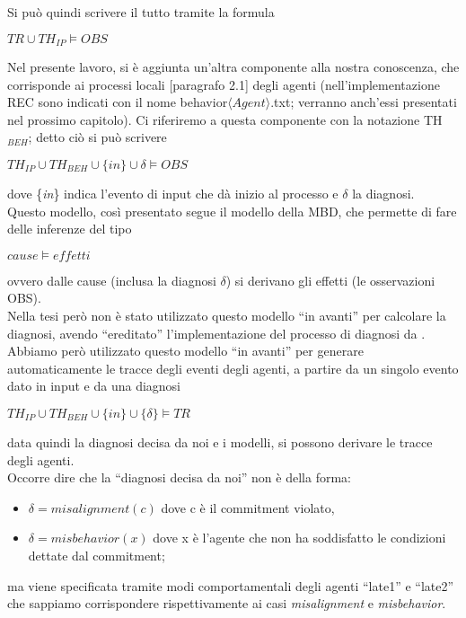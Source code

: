 \documentclass[a4paper,12pt]{report}
\newcommand{\virgolette}[1]{``#1''}
\begin{document}
\newpage
Si può quindi scrivere il tutto tramite la formula
\begin{center}
    $TR\cup TH_{IP}\models OBS$
\end{center}
Nel presente lavoro, si è aggiunta un'altra componente alla nostra conoscenza, che corrisponde ai processi locali [paragrafo 2.1] degli agenti (nell'implementazione REC sono indicati con il nome behavior$\langle Agent\rangle$.txt; verranno anch'essi presentati nel prossimo capitolo). Ci riferiremo a questa componente con la notazione TH$_{BEH}$; detto ciò si può scrivere
\begin{center}
    $TH_{IP}\cup TH_{BEH}\cup \{in\}\cup \delta \models OBS$
\end{center}
dove \{\textit{in}\} indica l'evento di input che dà inizio al processo e $\delta$ la diagnosi.\\
Questo modello, così presentato segue il modello della MBD, che permette di fare delle inferenze del tipo
\begin{center}
    $cause\models effetti$
\end{center}
ovvero dalle cause (inclusa la diagnosi $\delta$) si derivano gli effetti (le osservazioni OBS).\\
Nella tesi però non è stato utilizzato questo modello \virgolette{in avanti} per calcolare la diagnosi, avendo \virgolette{ereditato} l'implementazione del processo di diagnosi da \cite{rif5}.\\
Abbiamo però utilizzato questo modello \virgolette{in avanti} per generare automaticamente le tracce degli eventi degli agenti, a partire da un singolo evento dato in input e da una diagnosi
\begin{center}
    $TH_{IP}\cup TH_{BEH}\cup \{in\}\cup \{\delta\}\models TR$
\end{center}
data quindi la diagnosi decisa da noi e i modelli, si possono derivare le tracce degli agenti.\\
Occorre dire che la \virgolette{diagnosi decisa da noi} non è della forma:
\begin{itemize}
    \item $\delta = misalignment(c)$ dove c è il commitment violato,
    \item $\delta = misbehavior(x)$ dove x è l'agente che non ha soddisfatto le condizioni dettate dal commitment;
\end{itemize}
ma viene specificata tramite modi comportamentali degli agenti \virgolette{late1} e \virgolette{late2} che sappiamo corrispondere rispettivamente ai casi \textit{misalignment} e \textit{misbehavior}.
\end{document}
